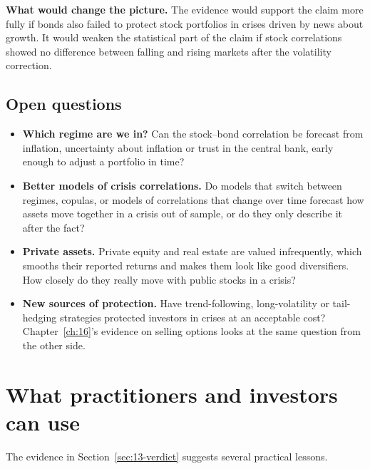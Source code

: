 \textbf{What would change the picture.} The evidence would support the claim more fully if bonds also failed to protect stock portfolios in crises driven by news about growth. It would weaken the statistical part of the claim if stock correlations showed no difference between falling and rising markets after the volatility correction.

\subsection{Open questions}
\label{sec:13-open}

\begin{itemize}
  \item \textbf{Which regime are we in?} Can the stock--bond correlation be forecast from inflation, uncertainty about inflation or trust in the central bank, early enough to adjust a portfolio in time?
  \item \textbf{Better models of crisis correlations.} Do models that switch between regimes, copulas, or models of correlations that change over time forecast how assets move together in a crisis out of sample, or do they only describe it after the fact?
  \item \textbf{Private assets.} Private equity and real estate are valued infrequently, which smooths their reported returns and makes them look like good diversifiers. How closely do they really move with public stocks in a crisis?
  \item \textbf{New sources of protection.} Have trend-following, long-volatility or tail-hedging strategies protected investors in crises at an acceptable cost? Chapter~\ref{ch:16}'s evidence on selling options looks at the same question from the other side.
\end{itemize}

\section{What practitioners and investors can use}
\label{sec:13-investors}

The evidence in Section~\ref{sec:13-verdict} suggests several practical lessons.

